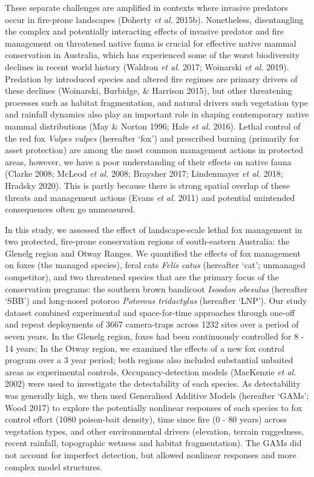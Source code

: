 \documentclass[11pt,a4paper,titlepage,twoside,openright]{style/unimelbthesis}
\begin{document}
\begin{mainmatter}
These separate challenges are amplified in contexts where invasive predators occur in fire-prone landscapes (Doherty \emph{et al.} 2015b). Nonetheless, disentangling the complex and potentially interacting effects of invasive predator and fire management on threatened native fauna is crucial for effective native mammal conservation in Australia, which has experienced some of the worst biodiversity declines in recent world history (Waldron \emph{et al.} 2017; Woinarski \emph{et al.} 2019). Predation by introduced species and altered fire regimes are primary drivers of these declines (Woinarski, Burbidge, \& Harrison 2015), but other threatening processes such as habitat fragmentation, and natural drivers such vegetation type and rainfall dynamics also play an important role in shaping contemporary native mammal distributions (May \& Norton 1996; Hale \emph{et al.} 2016). Lethal control of the red fox \emph{Vulpes vulpes} (hereafter `fox') and prescribed burning (primarily for asset protection) are among the most common management actions in protected areas, however, we have a poor understanding of their effects on native fauna (Clarke 2008; McLeod \emph{et al.} 2008; Braysher 2017; Lindenmayer \emph{et al.} 2018; Hradsky 2020). This is partly because there is strong spatial overlap of these threats and management actions (Evans \emph{et al.} 2011) and potential unintended consequences often go unmeasured.

In this study, we assessed the effect of landscape-scale lethal fox management in two protected, fire-prone conservation regions of south-eastern Australia: the Glenelg region and Otway Ranges. We quantified the effects of fox management on foxes (the managed species), feral cats \emph{Felis catus} (hereafter `cat'; unmanaged competitor), and two threatened species that are the primary focus of the conservation programs: the southern brown bandicoot \emph{Isoodon obesulus} (hereafter `SBB') and long-nosed potoroo \emph{Potorous tridactylus} (hereafter `LNP'). Our study dataset combined experimental and space-for-time approaches through one-off and repeat deployments of 3667 camera-traps across 1232 sites over a period of seven years. In the Glenelg region, foxes had been continuously controlled for 8 - 14 years; In the Otway region, we examined the effects of a new fox control program over a 3 year period; both regions also included substantial unbaited areas as experimental controls. Occupancy-detection models (MacKenzie \emph{et al.} 2002) were used to investigate the detectability of each species. As detectability was generally high, we then used Generalised Additive Models (hereafter `GAMs'; Wood 2017) to explore the potentially nonlinear responses of each species to fox control effort (1080 poison-bait density), time since fire (0 - 80 years) across vegetation types, and other environmental drivers (elevation, terrain ruggedness, recent rainfall, topographic wetness and habitat fragmentation). The GAMs did not account for imperfect detection, but allowed nonlinear responses and more complex model structures.


\end{mainmatter}
\end{document}
